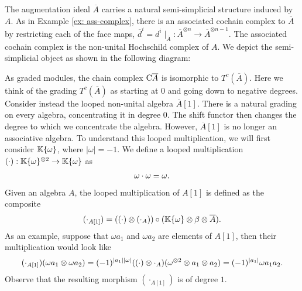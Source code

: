 \documentclass[../thesis.tex]{subfiles}
\begin{document}
            The augmentation ideal $\overline{A}$ carries a natural semi-simplicial structure induced by $A$. As in Example \ref{ex: ass-complex}, there is an associated cochain complex to $\overline{A}$ by restricting each of the face maps, ${\overline{d}}^i = d^i {\mid}_{\overline{A}}:\overline{A}^{\otimes n} \rightarrow \overline{A}^{\otimes n-1}$. The associated cochain complex is the non-unital Hochschild complex of $A$. We depict the semi-simplicial object as shown in the following diagram:
            \begin{center}
            \end{center}

            As graded modules, the chain complex $\tt{C}\overline{A}$ is isomorphic to $T^c(\overline{A})$. Here we think of the grading $T^c(\overline{A})$ as starting at $0$ and going down to negative degrees. Consider instead the looped non-unital algebra $\overline{A}[1]$. There is a natural grading on every algebra, concentrating it in degree $0$. The shift functor then changes the degree to which we concentrate the algebra. However, $\overline{A}[1]$ is no longer an associative algebra. To understand this looped multiplication, we will first consider $\mathbb{K}\startset{\omega}$, where $|\omega| = -1$. We define a looped multiplication $(\cdot):\mathbb{K}\startset{\omega}^{\otimes 2} \rightarrow \mathbb{K}\startset{\omega}$ as
            \begin{align*}
                \omega \cdot \omega = \omega\tt{.}
            \end{align*}
            Given an algebra $A$, the looped multiplication of $A[1]$ is defined as the composite 
            \begin{align*}
                (\cdot_{A[1]}) = ((\cdot) \otimes (\cdot_A)) \circ (\mathbb{K}\startset{\omega} \otimes \beta \otimes \overline{A})\tt{.} 
            \end{align*}
            As an example, suppose that $\omega a_1$ and $\omega a_2$ are elements of $A[1]$, then their multiplication would look like
            \begin{align*}
                (\cdot_{A[1]})(\omega a_1 \otimes \omega a_2) = (-1)^{|a_1||\omega|}((\cdot) \otimes \cdot_{A})(\omega^{\otimes 2} \otimes a_1 \otimes a_2) = (-1)^{|a_1|}\omega a_1 a_2\tt{.}
            \end{align*}
            Observe that the resulting morphism $(\cdot_{A[1]})$ is of degree $1$.
\end{document}
